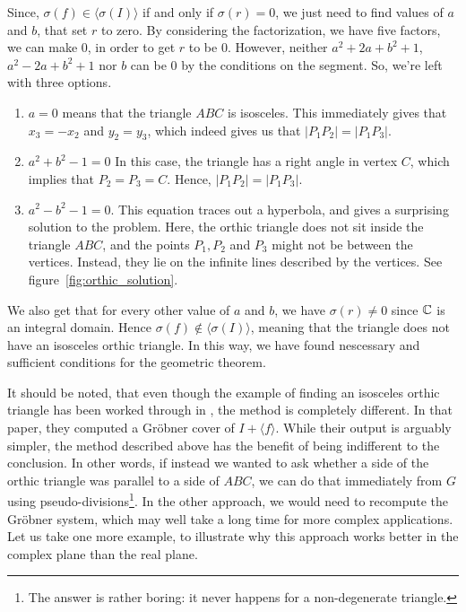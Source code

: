 \begin{example}
  Since, $\sigma(f) \in \langle \sigma(I) \rangle$ if and only if $\sigma(r) = 0$, we just need to find values of $a$ and $b$, that set $r$ to zero. By considering the factorization, we have five factors, we can make 0, in order to get $r$ to be 0. However, neither $a^{2} + 2a + b^{2} + 1$, $a^{2} - 2a + b^{2} + 1$ nor $b$ can be $0$ by the conditions on the segment. So, we're left with three options.
  \begin{enumerate}
    \item $a = 0$ means that the triangle $ABC$ is isosceles. This immediately gives that $x_{3} = -x_{2}$ and $y_{2} = y_{3}$, which indeed gives us that $|P_{1}P_{2}| = |P_{1}P_{3}|$.
    \item $a^{2} + b^{2} - 1 = 0$ In this case, the triangle has a right angle in vertex $C$, which implies that $P_{2} = P_{3} = C$. Hence, $|P_{1}P_{2}| = |P_{1}P_{3}|$.
          \item $a^{2} - b^{2} - 1 = 0$. This equation traces out a hyperbola, and gives a surprising solution to the problem. Here, the orthic triangle does not sit inside the triangle $ABC$, and the points $P_{1}, P_{2}$ and $P_{3}$ might not be between the vertices. Instead, they lie on the infinite lines described by the vertices. See figure~\ref{fig:orthic_solution}.
  \end{enumerate}

  We also get that for every other value of $a$ and $b$, we have $\sigma(r) \neq 0$ since $\mathbb{C}$ is an integral domain. Hence $\sigma(f) \notin \langle \sigma(I) \rangle$, meaning that the triangle does not have an isosceles orthic triangle. In this way, we have found nescessary and sufficient conditions for the geometric theorem.
\end{example}

It should be noted, that even though the example of finding an isosceles orthic triangle has been worked through in \cite{MONTES20101391}, the method is completely different. In that paper, they computed a Gröbner cover of $I + \langle f \rangle$. While their output is arguably simpler, the method described above has the benefit of being indifferent to the conclusion. In other words, if instead we wanted to ask whether a side of the orthic triangle was parallel to a side of $ABC$, we can do that immediately from $G$ using pseudo-divisions\footnote{The answer is rather boring: it never happens for a non-degenerate triangle.}. In the other approach, we would need to recompute the Gröbner system, which may well take a long time for more complex applications. Let us take one more example, to illustrate why this approach works better in the complex plane than the real plane.

